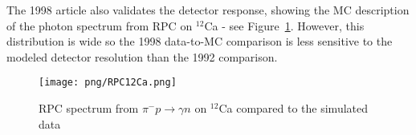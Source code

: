  The 1998 article also validates the detector response, showing the MC description of the
 photon spectrum from RPC on $^{12}$Ca  - see Figure~\ref{fig:art9}. However, this distribution
 is wide so the 1998 data-to-MC comparison is less sensitive to the modeled detector resolution
 than the 1992 comparison.

\begin{figure}[!h]
 \begin{center}
 \texttt{[image: png/RPC12Ca.png]} 
 \end{center}
 \caption{RPC spectrum from  $\pi^{-}p \rightarrow \gamma n$ on  $^{12}$Ca compared to the simulated data }
 \label{fig:art9}
 \end{figure}
